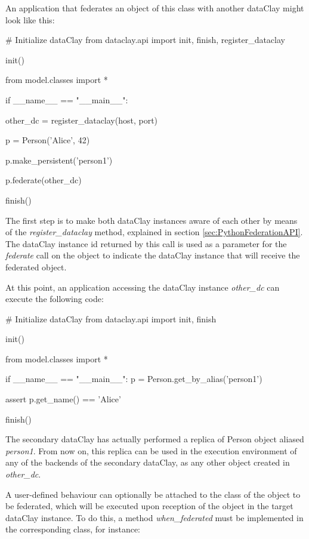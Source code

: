 An application that federates an object of this class with another dataClay might look like this:

\begin{tBox}
\begin{python}
# Initialize dataClay
from dataclay.api import init, finish, register_dataclay

init()

from model.classes import *

if __name__ == "__main__":
   
    other_dc = register_dataclay(host, port)
    
    p = Person('Alice', 42)

    p.make_persistent('person1')

    p.federate(other_dc)
    
    finish()
\end{python}
\end{tBox}

The first step is to make both dataClay instances aware of each other by means of the \textit{register_dataclay} method, explained in section \ref{sec:PythonFederationAPI}. The dataClay instance id returned by this call is used as a parameter for the \textit{federate} call on the object to indicate the dataClay instance that will receive the federated object. 

At this point, an application accessing the dataClay instance \textit{other\_dc} can execute the following code:

\begin{tBox}
\begin{python}
# Initialize dataClay
from dataclay.api import init, finish

init()

from model.classes import *

if __name__ == "__main__":
    p = Person.get_by_alias('person1')
    
    assert p.get\_name() == 'Alice'
    
    finish()
\end{python}
\end{tBox}

The secondary dataClay has actually performed a replica of Person object aliased \textit{person1}. From now on, this 
replica can be used in the execution environment of any of the backends of the secondary dataClay, as any other object created in \textit{other\_dc}.

A user-defined behaviour can optionally be attached to the class of the object to be federated, which will be executed upon reception of the object in the target dataClay instance. To do this, a method \textit{when\_federated} must be implemented in the corresponding class, for instance:


